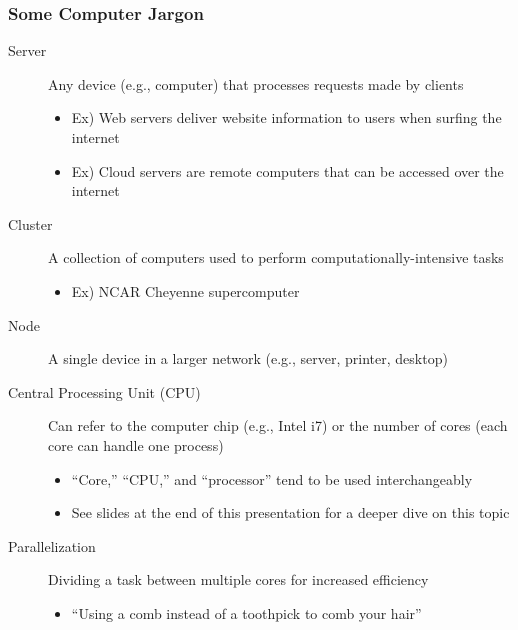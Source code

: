 \documentclass[hyperref,pdfa,unicode,utf8,usepdftitle]{beamer}
\begin{document}
\begin{frame}
  \frametitle{Some Computer Jargon}
  \begin{description}
  \item[Server]  Any device (e.g., computer) that processes
    requests made by clients
    \begin{itemize}
    \item Ex) Web servers deliver website information to users when
      surfing the internet
    \item Ex) Cloud servers are remote computers that can be accessed
      over the internet
    \end{itemize}
  \item[Cluster]  A collection of computers used to perform
    computationally-intensive tasks
    \begin{itemize}
    \item Ex) NCAR Cheyenne supercomputer
    \end{itemize}
  \item[Node] A single device in a larger network (e.g., server,
    printer, desktop)
  \item[Central Processing Unit (CPU)] Can refer to the computer chip
    (e.g., Intel i7) or the number of cores (each core can handle one
    process)
    \begin{itemize}
    \item “Core,” “CPU,” and “processor” tend to be used
      interchangeably
    \item See slides at the end of this presentation for a deeper dive
      on this topic
    \end{itemize}
  \item[Parallelization]  Dividing a task between multiple cores for
    increased efficiency
    \begin{itemize}
    \item “Using a comb instead of a toothpick to comb your hair”
    \end{itemize}
  \end{description}
\end{frame}
\end{document}
